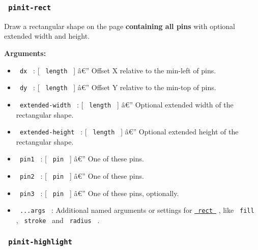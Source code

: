 \subsubsection{\texorpdfstring{\texttt{\ pinit-rect\ }}{ pinit-rect }}\label{pinit-rect}

Draw a rectangular shape on the page \textbf{containing all pins} with
optional extended width and height.

\begin{Shaded}
\begin{Highlighting}[]
\end{Highlighting}
\end{Shaded}

\textbf{Arguments:}

\begin{itemize}
\tightlist
\item
  \texttt{\ dx\ } : {[} \texttt{\ length\ } {]} â€'' Offset X relative
  to the min-left of pins.
\item
  \texttt{\ dy\ } : {[} \texttt{\ length\ } {]} â€'' Offset Y relative
  to the min-top of pins.
\item
  \texttt{\ extended-width\ } : {[} \texttt{\ length\ } {]} â€''
  Optional extended width of the rectangular shape.
\item
  \texttt{\ extended-height\ } : {[} \texttt{\ length\ } {]} â€''
  Optional extended height of the rectangular shape.
\item
  \texttt{\ pin1\ } : {[} \texttt{\ pin\ } {]} â€'' One of these pins.
\item
  \texttt{\ pin2\ } : {[} \texttt{\ pin\ } {]} â€'' One of these pins.
\item
  \texttt{\ pin3\ } : {[} \texttt{\ pin\ } {]} â€'' One of these pins,
  optionally.
\item
  \texttt{\ ...args\ } : Additional named arguments or settings for
  \href{https://typst.app/docs/reference/visualize/rect/}{\texttt{\ rect\ }}
  , like \texttt{\ fill\ } , \texttt{\ stroke\ } and \texttt{\ radius\ }
  .
\end{itemize}

\subsubsection{\texorpdfstring{\texttt{\ pinit-highlight\ }}{ pinit-highlight }}\label{pinit-highlight}

